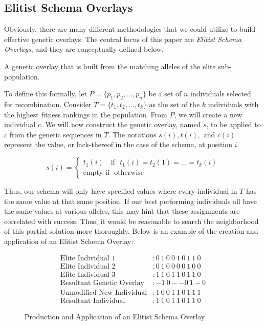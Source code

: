 \subsection*{Elitist Schema Overlays}
Obviously, there are many different methodologies that we could utilize to build effective genetic overlays. The central focus of this paper are \emph{Elitist Schema Overlays}, and they are conceptually defined below.

\begin{eschema}
A genetic overlay that is built from the matching alleles of the elite sub-population.
\end{eschema}

To define this formally, let $P = \{p_1,p_2,\ldots,p_n\}$ be a set of $n$ individuals selected for recombination. Consider $T=\{t_1,t_2,\ldots,t_k\}$ as the set of the $k$ individuals with the highest fitness rankings in the population. From $P$, we will create a new individual $c$.  We will now construct the genetic overlay, named $s$, to be applied to $c$ from the genetic sequences in $T$. The notations $s(i), t(i), \text{ and } c(i)$ represent the value, or lack-thereof in the case of the schema, at position $i$.
 
 \begin{displaymath}
   s(i) = \left\{
     \begin{array}{lr}
       t_1(i) \text{~~~if~ } t_1(i) = t_2(1) = \ldots = t_k(i) \\
       \text{empty~} \text{if~ } \text{otherwise} 
     \end{array}
   \right.
\end{displaymath} 

Thus, our schema will only have specified values where every individual in $T$ has the same value at that same position. If our best performing individuals all have the same values at various alleles, this may hint that these assignments are correlated with success. Thus, it would be reasonable to search the neighborhood of this partial solution more thoroughly. Below is an example of the creation and application of an Elitist Schema Overlay:
\begin{figure}[h!]
\centering 
\begin{align*}
\text{Elite Individual 1} &: 0~1~0~0~1~0~1~1~0 			\\
\text{Elite Individual 2} &: 0~1~0~0~0~0~1~0~0 			\\
\text{Elite Individual 3} &: 1~1~0~1~1~0~1~1~0 			\\
\text{Resultant Genetic Overlay} &:   -1~0--0~1-0			\\
\text{Unmodified New Individual} &: 1~0~0~1~1~0~1~1~1	\\		
\text{Resultant Individual} &: 1~1~0~1~1~0~1~1~0
\end{align*}
\caption{Production and Application of an Elitist Schema Overlay}
\end{figure}

